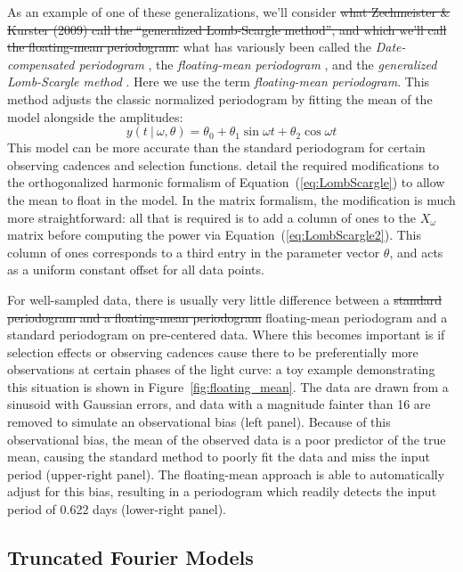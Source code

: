 \documentclass{emulateapj}
\newcommand{\Fig}[1]{Figure~\ref{fig:#1}}
\newcommand{\fig}[1]{\Fig{#1}}
\newcommand{\Eq}[1]{Equation~(\ref{eq:#1})}
\newcommand{\eq}[1]{\Eq{#1}}
\newcommand{\sectlabel}[1]{\label{sect:#1}}
\newcommand{\new}[1]{{\color{red} #1}}
\newcommand{\old}[1]{{\sout{#1}}}
\begin{document}
As an example of one of these generalizations, we'll consider \old{what Zechmeister \& Kurster (2009) call the ``generalized Lomb-Scargle method'', and which we'll call the floating-mean periodogram.}
\new{what has variously been called the {\it Date-compensated periodogram} \citep{Ferraz-Mello81}, the {\it floating-mean periodogram} \citep{Cumming99}, and the {\it generalized Lomb-Scargle method} \citep{Zechmeister09}. Here we use the term {\it floating-mean periodogram}.} This method adjusts the classic normalized periodogram by fitting the mean of the model alongside the amplitudes:
\begin{equation}
  y(t~|~\omega, \theta) = \theta_0 + \theta_1\sin\omega t + \theta_2\cos\omega t
\end{equation}
This model can be more accurate than the standard periodogram for certain observing cadences and selection functions. \citet{Zechmeister09} detail the required modifications to the \new{orthogonalized} harmonic formalism of \eq{LombScargle} to allow the mean to float in the model. In the matrix formalism, the modification is much more straightforward: all that is required is to add a column of ones to the $X_\omega$ matrix before computing the power via \eq{LombScargle2}. This column of ones corresponds to a third entry in the parameter vector $\theta$, and acts as a uniform constant offset for all data points.

For well-sampled data, there is usually very little difference between a \old{standard periodogram and a floating-mean periodogram} \new{floating-mean periodogram and a standard periodogram on pre-centered data}. Where this becomes important is if selection effects or observing cadences cause there to be preferentially more observations at certain phases of the light curve: a toy example demonstrating this situation is shown in \fig{floating_mean}. The data are drawn from a sinusoid with Gaussian errors, and data with a magnitude fainter than 16 are removed to simulate an observational bias (left panel). Because of this observational bias, the mean of the observed data is a poor predictor of the true mean, causing the standard method to poorly fit the data and miss the input period (upper-right panel). The floating-mean approach is able to automatically adjust for this bias, resulting in a periodogram which readily detects the input period of 0.622 days (lower-right panel).


\subsection{Truncated Fourier Models}
\sectlabel{multiterm}
\end{document}
